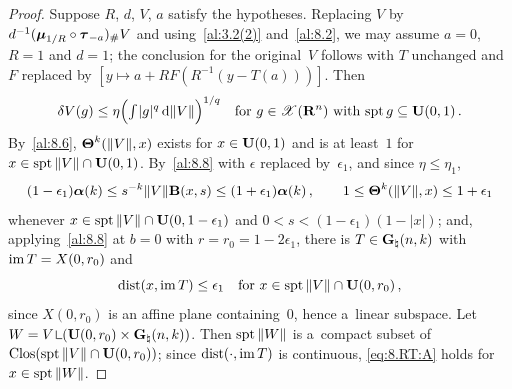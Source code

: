\begin{proof}
    Suppose $R$, $d$, $V$, $a$ satisfy the hypotheses. Replacing $V$ by $d^{-1} (\boldsymbol{\mu}_{1/R} \circ
    \boldsymbol{\tau}_{-a})_\# V$ and using~\ref{al:3.2(2)} and~\ref{al:8.2}, we may assume $a = 0$, $R = 1$
    and $d = 1$; the conclusion for the original~$V$ follows with $T$ unchanged and $F$ replaced by
    $[y \mapsto a + R F(R^{-1}(y - T(a)))]$. Then
    \begin{displaymath}
        \delta V(g) \le \eta \Big( {\textstyle\int_{}^{}} |g|^q \,\mathrm{d} \|V\| \Big)^{1/q} \quad \text{for $g \in
        \mathscr{X}(\mathbf{R}^{n})$ with $\operatorname{spt} g \subseteq \mathbf{U}(0,1)$} \,.
    \end{displaymath}
    By~\ref{al:8.6}, $\boldsymbol{\Theta}^{k}(\|V\|,x)$ exists for $x \in \mathbf{U}(0,1)$ and is at least~$1$
    for $x \in \operatorname{spt} \|V\| \cap \mathbf{U}(0,1)$. By~\ref{al:8.8} with $\epsilon$ replaced
    by~$\epsilon_1$, and since $\eta \le \eta_1$,
    \begin{equation}
        \label{eq:8.RT:B}
        (1 - \epsilon_1) \boldsymbol{\alpha}(k) \le s^{-k} \|V\| \mathbf{B}(x,s) \le (1 + \epsilon_1)
        \boldsymbol{\alpha}(k) \,, \qquad 1 \le \boldsymbol{\Theta}^{k}(\|V\|,x) \le 1 + \epsilon_1
    \end{equation}
    whenever $x \in \operatorname{spt} \|V\| \cap \mathbf{U}(0,1 - \epsilon_1)$ and $0 < s < (1 - \epsilon_1)(1 -
    |x|)$; and, applying~\ref{al:8.8} at $b = 0$ with $r = r_0 = 1 - 2 \epsilon_1$, there is $T \in
    \mathbf{G}_{\natural}(n,k)$ with $\operatorname{im} T = X(0,r_0)$ and
    \begin{equation}
        \label{eq:8.RT:A}
        \operatorname{dist}(x, \operatorname{im} T) \le \epsilon_1 \quad \text{for $x \in \operatorname{spt} \|V\| \cap \mathbf{U}(0,r_0)$}
        \,,
    \end{equation}
    since $X(0,r_0)$ is an affine plane containing~$0$, hence a~linear subspace. Let $W = V
    \restrict (\oball{0}{r_0} \times \pgrass{\adim}{\vdim})$. Then $\operatorname{spt} \|W\|$ is a~compact subset
    of $\mathop{\mathrm{Clos}}(\operatorname{spt} \|V\| \cap \mathbf{U}(0,r_0))$; since $\operatorname{dist}(\cdot, \operatorname{im} T)$ is continuous,
    \eqref{eq:8.RT:A} holds for $x \in \operatorname{spt} \|W\|$.


\end{proof}
